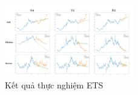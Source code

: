 \begin{figure}[htbp]
\centerline{\includegraphics[width=0.5\textwidth]{img/ETS_result.png}}
\caption{Kết quả thực nghiệm ETS}
\label{fig}
\end{figure}